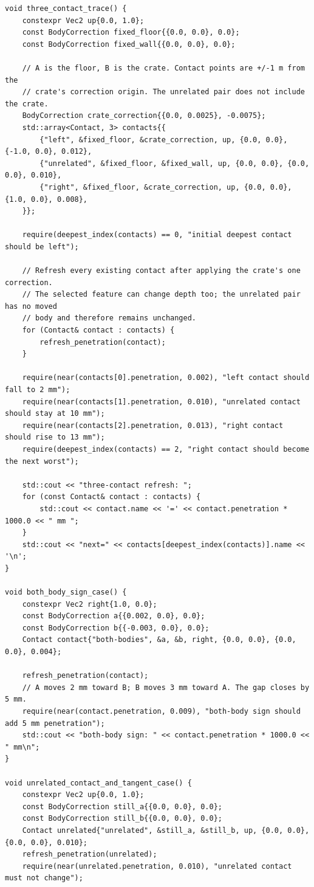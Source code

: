 \begin{verbatim}
void three_contact_trace() {
    constexpr Vec2 up{0.0, 1.0};
    const BodyCorrection fixed_floor{{0.0, 0.0}, 0.0};
    const BodyCorrection fixed_wall{{0.0, 0.0}, 0.0};

    // A is the floor, B is the crate. Contact points are +/-1 m from the
    // crate's correction origin. The unrelated pair does not include the crate.
    BodyCorrection crate_correction{{0.0, 0.0025}, -0.0075};
    std::array<Contact, 3> contacts{{
        {"left", &fixed_floor, &crate_correction, up, {0.0, 0.0}, {-1.0, 0.0}, 0.012},
        {"unrelated", &fixed_floor, &fixed_wall, up, {0.0, 0.0}, {0.0, 0.0}, 0.010},
        {"right", &fixed_floor, &crate_correction, up, {0.0, 0.0}, {1.0, 0.0}, 0.008},
    }};

    require(deepest_index(contacts) == 0, "initial deepest contact should be left");

    // Refresh every existing contact after applying the crate's one correction.
    // The selected feature can change depth too; the unrelated pair has no moved
    // body and therefore remains unchanged.
    for (Contact& contact : contacts) {
        refresh_penetration(contact);
    }

    require(near(contacts[0].penetration, 0.002), "left contact should fall to 2 mm");
    require(near(contacts[1].penetration, 0.010), "unrelated contact should stay at 10 mm");
    require(near(contacts[2].penetration, 0.013), "right contact should rise to 13 mm");
    require(deepest_index(contacts) == 2, "right contact should become the next worst");

    std::cout << "three-contact refresh: ";
    for (const Contact& contact : contacts) {
        std::cout << contact.name << '=' << contact.penetration * 1000.0 << " mm ";
    }
    std::cout << "next=" << contacts[deepest_index(contacts)].name << '\n';
}

void both_body_sign_case() {
    constexpr Vec2 right{1.0, 0.0};
    const BodyCorrection a{{0.002, 0.0}, 0.0};
    const BodyCorrection b{{-0.003, 0.0}, 0.0};
    Contact contact{"both-bodies", &a, &b, right, {0.0, 0.0}, {0.0, 0.0}, 0.004};

    refresh_penetration(contact);
    // A moves 2 mm toward B; B moves 3 mm toward A. The gap closes by 5 mm.
    require(near(contact.penetration, 0.009), "both-body sign should add 5 mm penetration");
    std::cout << "both-body sign: " << contact.penetration * 1000.0 << " mm\n";
}

void unrelated_contact_and_tangent_case() {
    constexpr Vec2 up{0.0, 1.0};
    const BodyCorrection still_a{{0.0, 0.0}, 0.0};
    const BodyCorrection still_b{{0.0, 0.0}, 0.0};
    Contact unrelated{"unrelated", &still_a, &still_b, up, {0.0, 0.0}, {0.0, 0.0}, 0.010};
    refresh_penetration(unrelated);
    require(near(unrelated.penetration, 0.010), "unrelated contact must not change");


\end{verbatim}
